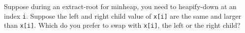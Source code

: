   Suppose during an extract-root for minheap,
  you need to heapify-down at an index \verb!i!.
  Suppose the left and right child value of \verb!x[i]! are the same and
  larger than \verb!x[i]!.
  Which do you prefer to swap with \verb!x[i]!, the left or the right
  child?
